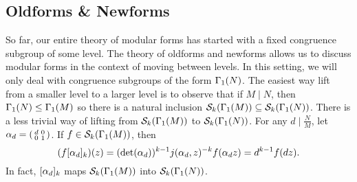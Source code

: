     \subsection*{Oldforms \& Newforms}
      So far, our entire theory of modular forms has started with a fixed congruence subgroup of some level. The theory of oldforms and newforms allows us to discuss modular forms in the context of moving between levels. In this setting, we will only deal with congruence subgroups of the form $\Gamma_{1}(N)$. The easiest way lift from a smaller level to a larger level is to observe that if $M \mid N$, then $\Gamma_{1}(N) \le \Gamma_{1}(M)$ so there is a natural inclusion $\mathcal{S}_{k}(\Gamma_{1}(M)) \subseteq \mathcal{S}_{k}(\Gamma_{1}(N))$. There is a less trivial way of lifting from $\mathcal{S}_{k}(\Gamma_{1}(M))$ to $\mathcal{S}_{k}(\Gamma_{1}(N))$. For any $d \mid \frac{N}{M}$, let $\alpha_{d} = \begin{psmallmatrix} d & 0 \\ 0 & 1 \end{psmallmatrix}$. If $f \in \mathcal{S}_{k}(\Gamma_{1}(M))$, then
      \[
          (f[\alpha_{d}]_{k})(z) = (\det(\alpha_{d}))^{k-1}j(\alpha_{d},z)^{-k}f(\alpha_{d} z) = d^{k-1}f(dz).
      \]
      In fact, $[\alpha_{d}]_{k}$ maps $\mathcal{S}_{k}(\Gamma_{1}(M))$ into $\mathcal{S}_{k}(\Gamma_{1}(N))$.
      
